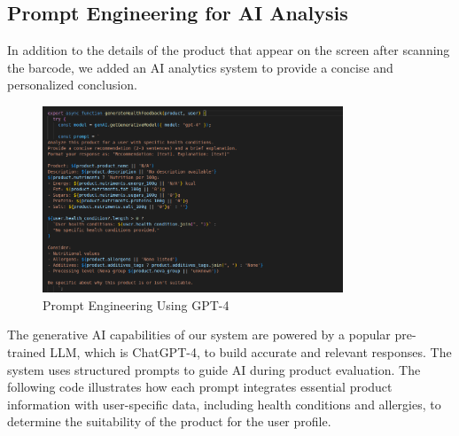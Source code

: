 \subsection{Prompt Engineering for AI Analysis}
\par In addition to the details of the product that appear on the screen after scanning the barcode, we added an AI analytics system to provide a concise and personalized conclusion.
\begin{center}
\begin{figure}[H]
    \includegraphics[width=0.80\textwidth]{images/prompt_engineering.png}
    \caption{Prompt Engineering Using GPT-4} 
    \label{fig:Prompt_Engineering}
\end{figure}
\end{center}
 The generative AI capabilities of our system are powered by a popular pre-trained LLM, which is ChatGPT-4, to build accurate and relevant responses. The system uses structured prompts to guide AI during product evaluation.
The following code illustrates how each prompt integrates essential product information with user-specific data, including health conditions and allergies, to determine the suitability of the product for the user profile.

